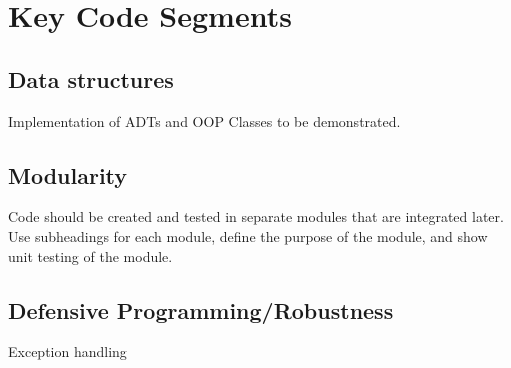 \section{Key Code Segments}
\subsection{Data structures}
Implementation of ADTs and OOP Classes to be demonstrated.

\subsection{Modularity}
Code should be created and tested in separate modules that are integrated later. Use subheadings for each module, define the purpose of the module, and show unit testing of the module.

\subsection{Defensive Programming/Robustness}
Exception handling
